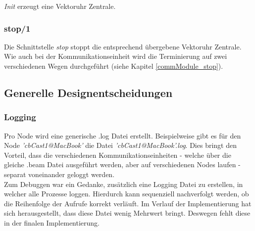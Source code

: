 \textit{Init} erzeugt eine Vektoruhr Zentrale.

\subsubsection{stop/1}

Die Schnittstelle \textit{stop} stoppt die entsprechend übergebene Vektoruhr Zentrale. Wie auch bei der Kommunikationseinheit wird die Terminierung auf zwei verschiedenen Wegen durchgeführt (siehe Kapitel \ref{commModule_stop}).

\subsection{Generelle Designentscheidungen}

\subsubsection{Logging}

Pro Node wird eine generische .log Datei erstellt. Beispielweise gibt es für den Node \textit{'cbCast1@MacBook'} die Datei \textit{'cbCast1@MacBook'.log}. Dies bringt den Vorteil, dass die verschiedenen Kommunikationseinheiten - welche über die gleiche .beam Datei ausgeführt werden, aber auf verschiedenen Nodes laufen - separat voneinander geloggt werden.
\\Zum Debuggen war ein Gedanke, zusätzlich eine Logging Datei zu erstellen, in welcher alle Prozesse loggen. Hierdurch kann sequenziell nachverfolgt werden, ob die Reihenfolge der Aufrufe korrekt verläuft. Im Verlauf der Implementierung hat sich herausgestellt, dass diese Datei wenig Mehrwert bringt. Deswegen fehlt diese in der finalen Implementierung.